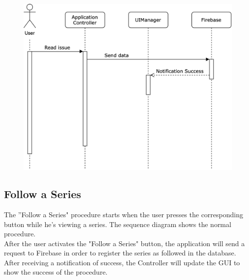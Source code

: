 \vspace{5mm}

\begin{figure}[h]
\centering
\includegraphics[width=\textwidth]{img/seqdiagrams/readissue}
\end{figure}

\clearpage

\subsection{Follow a Series}
The ”Follow a Series" procedure starts when the user presses the corresponding button while he's viewing a series. The sequence diagram shows the normal procedure. \\
After the user activates the "Follow a Series" button, the application will send a request to Firebase in order to register the series as followed in the database. \\
After receiving a notification of success, the Controller will update the GUI to show the success of the procedure. 

\vspace{5mm}

